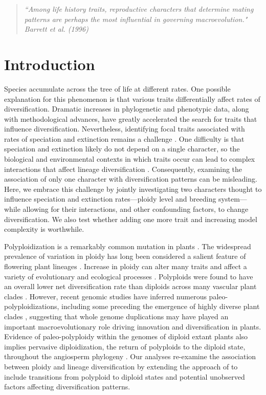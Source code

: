 \begin{quote}
\em{``Among life history traits, reproductive characters that determine mating patterns are perhaps the most influential in governing macroevolution." 
}
\\
\hspace*{\fill}\rm{ Barrett et al. (1996)}
\end{quote}

\section{Introduction}

Species accumulate across the tree of life at different rates. 
One possible explanation for this phenomenon is that various traits differentially affect rates of diversification. 
Dramatic increases in phylogenetic and phenotypic data, along with methodological advances, have greatly accelerated the search for traits that influence diversification.
Nevertheless, identifying focal traits associated with rates of speciation and extinction remains a challenge \citep[\eg][]{maddison_2015, rabosky_2015, beaulieu_2016, rabosky_2017}. 
One difficulty is that speciation and extinction likely do not depend on a single character, so the biological and environmental contexts in which traits occur can lead to complex interactions that affect lineage diversification \citep{beaulieu_2016, caetano_2018, herrera_2018}.
Consequently, examining the association of only one character with diversification patterns can be misleading. 
Here, we embrace this challenge by jointly investigating two characters thought to influence speciation and extinction rates---ploidy level and breeding system---while allowing for their interactions, and other confounding factors, to change diversification. 
We also test whether adding one more trait and increasing model complexity is worthwhile.

Polyploidization is a remarkably common mutation in plants \citep{husband_2013, zenilferguson_2017}.
The widespread prevalence of variation in ploidy has long been considered a salient feature of flowering plant lineages \citep{stebbins1938}. 
Increase in ploidy can alter many traits and affect a variety of evolutionary and ecological processes \citep{ramsey_2002, sessa_2019}.
Polyploids were found to have an overall lower net diversification rate than diploids across many vascular plant clades \citep{mayrose_2011, mayrose_2015}. 
However, recent genomic studies have inferred numerous paleo-polyploidizations, including some preceding the emergence of highly diverse plant clades \citep{soltis_2014, landis_2018}, suggesting that whole genome duplications may have played an important macroevolutionary role driving innovation and diversification in plants. 
Evidence of paleo-polyploidy within the genomes of diploid extant plants also implies pervasive diploidization, the return of polyploids to the diploid state, throughout the angiosperm phylogeny \citep{soltis_2015, dodsworth_2015}.
Our analyses re-examine the association between ploidy and lineage diversification by extending the approach of \citet{mayrose_2011, mayrose_2015} to include transitions from polyploid to diploid states and potential unobserved factors affecting diversification patterns.

